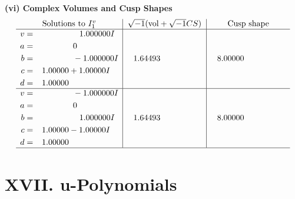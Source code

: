 \documentclass[1p]{elsarticle_modified}
\theoremstyle{definition}
\newcommand{\I}{\sqrt{-1}}
\begin{document}
\newpage\flushleft \textbf{(vi) Complex Volumes and Cusp Shapes}
$$\begin{array}{c|c|c}  
\text{Solutions to }I^v_{1}& \I (\text{vol} + \sqrt{-1}CS) & \text{Cusp shape}\\
 \hline 
\begin{aligned}
v &= \phantom{-0.000000 -}1.000000 I \\
a &= \phantom{-0.000000 } 0 \\
b &= \phantom{-0.000000 } -1.000000 I \\
c &= \phantom{-}1.00000 + 1.00000 I \\
d &= \phantom{-}1.00000\phantom{ +0.000000I}\end{aligned}
 & \phantom{-}1.64493\phantom{ +0.000000I} & \phantom{-}8.00000\phantom{ +0.000000I} \\ \hline\begin{aligned}
v &= \phantom{-0.000000 } -1.000000 I \\
a &= \phantom{-0.000000 } 0 \\
b &= \phantom{-0.000000 -}1.000000 I \\
c &= \phantom{-}1.00000 - 1.00000 I \\
d &= \phantom{-}1.00000\phantom{ +0.000000I}\end{aligned}
 & \phantom{-}1.64493\phantom{ +0.000000I} & \phantom{-}8.00000\phantom{ +0.000000I}\\
 \hline 
 \end{array}$$\newpage
\newpage\renewcommand{\arraystretch}{1}
\centering \section*{ XVII. u-Polynomials}
\end{document}
